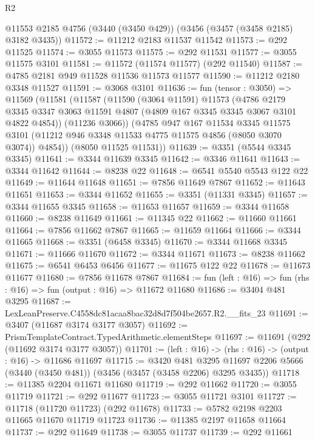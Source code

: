 \begin{lexlean}{R2}
\begin{coremodule}
    @11553
    @2185
    @4756
    (@3440 (@3450 @429))
    (@3456 (@3457 (@3458 @2185) @3182 @3435))
@11572 := @11212 @2183 @11537 @11542
@11573 := @292 @11525
@11574 := @3055 @11573
@11575 := @292 @11531
@11577 := @3055 @11575 @3101
@11581 := @11572 (@11574 @11577) (@292 @11540)
@11587 := @4785 @2181 @949 @11528 @11536 @11573 @11577
@11590 := @11212 @2180 @3348 @11527
@11591 := @3068 @3101
@11636 := fun (tensor : @3050) =>
  @11569
    (@11581
      (@11587
        (@11590
          (@3064 @11591)
          @11573
          (@4786
            @2179
            @3345
            @3347
            @3063
            @11591
            @4807
            (@4809 @167 @3345 @3345 @3067 @3101 @4822 @4854))
          (@11236 @3066))
        (@4785
          @947
          @167
          @11534
          @3345
          @11575
          @3101
          (@11212 @946 @3348 @11533 @4775 @11575 @4856 (@8050 @3070 @3074))
          @4854))
      (@8050 @11525 @11531))
@11639 := @3351 (@5544 @3345 @3345)
@11641 := @3344 @11639 @3345
@11642 := @3346 @11641
@11643 := @3344 @11642
@11644 := @8238 @22
@11648 := @6541 @5540 @5543 @122 @22
@11649 := @11644 @11648
@11651 := @7856 @11649 @7867
@11652 := @11643 @11651
@11653 := @3344 @11652
@11655 := @3351 (@11331 @3345)
@11657 := @3344 @11655 @3345
@11658 := @11653 @11657
@11659 := @3344 @11658
@11660 := @8238 @11649
@11661 := @11345 @22
@11662 := @11660 @11661
@11664 := @7856 @11662 @7867
@11665 := @11659 @11664
@11666 := @3344 @11665
@11668 := @3351 (@6458 @3345)
@11670 := @3344 @11668 @3345
@11671 := @11666 @11670
@11672 := @3344 @11671
@11673 := @8238 @11662
@11675 := @6541 @6453 @6456
@11677 := @11675 @122 @22
@11678 := @11673 @11677
@11680 := @7856 @11678 @7867
@11684 := fun (left : @16) => fun (rhs : @16) => fun (output : @16) => @11672 @11680
@11686 := @3404 @481 @3295
@11687 := LexLeanPreserve.C4558dc81acaa8bac32d8d7f504be2657.R2.__fits_23
@11691 := @3407 (@11687 @3174 @3177 @3057)
@11692 := PrismTemplateContract.TypedArithmetic.elementSteps
@11697 := @11691 (@292 (@11692 @3174 @3177 @3057))
@11701 := (left : @16) -> (rhs : @16) -> (output : @16) -> @11686 @11697
@11715 := @3420
    @481
    @3295
    @11697
    @2206
    @5666
    (@3440 (@3450 @481))
    (@3456 (@3457 (@3458 @2206) @3295 @3435))
@11718 := @11385 @2204 @11671 @11680
@11719 := @292 @11662
@11720 := @3055 @11719
@11721 := @292 @11677
@11723 := @3055 @11721 @3101
@11727 := @11718 (@11720 @11723) (@292 @11678)
@11733 := @5782 @2198 @2203 @11665 @11670 @11719 @11723
@11736 := @11385 @2197 @11658 @11664
@11737 := @292 @11649
@11738 := @3055 @11737
@11739 := @292 @11661

\end{coremodule}
\end{lexlean}
